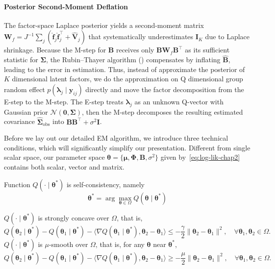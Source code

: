 \paragraph*{Posterior Second-Moment Deflation} The factor-space Laplace posterior yields a second-moment matrix $\mathbf{W}_{f}=J^{-1}\sum_{j}(\hat{\mathbf{f}}_{j}\hat{\mathbf{f}}_{j}^{\top}+\hat{\mathbf{V}}_{j})$ that systematically underestimates $\mathbf{I}_{K}$ due to Laplace shrinkage. Because the M-step for $\mathbf{B}$ receives only $\mathbf{BW}_{f}\mathbf{B}^{\top}$ as its sufficient statistic for $\bm{\Sigma}$, the Rubin–Thayer algorithm (\citet{Rubin1982}) compensates by inflating $\hat{\mathbf{B}}$, leading to the error in estimation. 
Thus, instead of approximate the posterior of $K$ dimensional latent factors, we do the approximation on Q dimensional group random effect $p(\bm{\lambda}_{j}\mid \bm{y}_{ij})$ directly and move the factor decomposition from the E-step to the M-step. The E-step treats $\bm{\lambda}_{j}$ as an unknown Q-vector with Gaussian prior $\mathcal{N}(\bm{0},\bm{\Sigma})$, then the M-step decomposes the resulting estimated covariance $\hat{\bm{\Sigma}}_{\text{obs}}$ into $\mathbf{BB}^{\top}+\sigma^{2}\mathbf{I}$.

Before we lay out our detailed EM algorithm, we introduce three technical conditions, which will significantly simplify our presentation. Different from single scalar space, our parameter space $\bm{\theta}=\{\bm{\mu}, \bm{\Phi}, \mathbf{B},\sigma^{2}\}$ given by~\eqref{eq:log-lik-chap2} contains both scalar, vector and matrix.

\begin{condition}
Function $Q(\cdot\mid \bm{\theta^{*}})$ is self-consistency, namely
\begin{equation}
    \bm{\theta^{*}}=\arg\max_{\bm{\theta}\in \Omega} Q(\bm{\theta}\mid \bm{\theta^{*}})
    \label{eq:self-consistency}
\end{equation}
\end{condition}

\begin{condition}
$Q(\cdot\mid \bm{\theta^{*}})$ is strongly concave over $\Omega$, that is,
\begin{equation}
    Q(\bm{\theta}_{2}\mid \bm{\theta^{*}})-Q(\bm{\theta}_{1}\mid \bm{\theta^{*}})-\langle \nabla Q(\bm{\theta}_{1}\mid \bm{\theta^{*}}), \bm{\theta}_{2}-\bm{\theta}_{1}\rangle\leq -\frac{\gamma}{2}\|\bm{\theta}_{2}-\bm{\theta}_{1}\|^{2}, \quad \forall \bm{\theta}_{1},\bm{\theta}_{2}\in \Omega.
    \label{eq:strong-concave}
\end{equation}
$Q(\cdot\mid \bm{\theta^{*}})$ is $\mu$-smooth over $\Omega$, that is, for any $\bm{\theta}$ near $\bm{\theta}^{*}$,
\begin{equation}
    Q(\bm{\theta}_{2}\mid \bm{\theta^{*}})-Q(\bm{\theta}_{1}\mid \bm{\theta^{*}})-\langle \nabla Q(\bm{\theta}_{1}\mid \bm{\theta^{*}}), \bm{\theta}_{2}-\bm{\theta}_{1}\rangle\geq -\frac{\mu}{2}\|\bm{\theta}_{2}-\bm{\theta}_{1}\|^{2}, \quad \forall \bm{\theta}_{1},\bm{\theta}_{2}\in \Omega.
    \label{eq:smooth}
\end{equation}
\end{condition}

